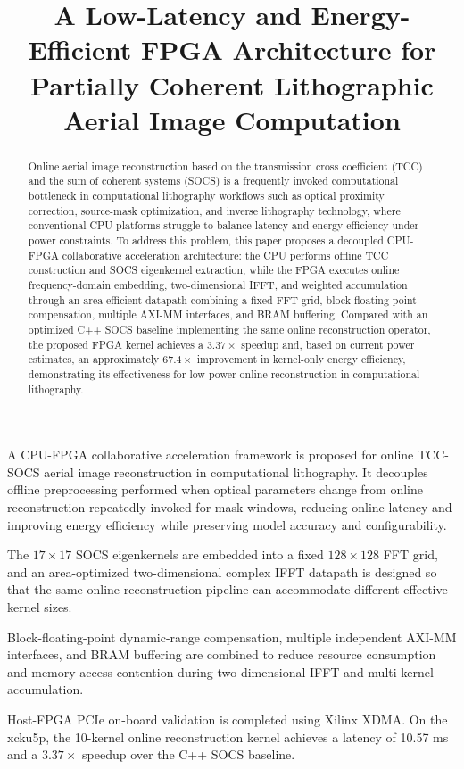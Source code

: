 \documentclass[
  preprint]{elsarticle}
\title{A Low-Latency and Energy-Efficient FPGA Architecture for Partially Coherent Lithographic Aerial Image Computation}
\author{}
\date{}
\begin{document}
\begin{frontmatter}
\maketitle

\begin{highlights}
\item
  A CPU-FPGA collaborative acceleration framework is proposed for online
  TCC-SOCS aerial image reconstruction in computational lithography. It
  decouples offline preprocessing performed when optical parameters
  change from online reconstruction repeatedly invoked for mask windows,
  reducing online latency and improving energy efficiency while
  preserving model accuracy and configurability.
\item
  The \(17 \times 17\) SOCS eigenkernels are embedded into a fixed
  \(128 \times 128\) FFT grid, and an area-optimized two-dimensional
  complex IFFT datapath is designed so that the same online
  reconstruction pipeline can accommodate different effective kernel
  sizes.
\item
  Block-floating-point dynamic-range compensation, multiple independent
  AXI-MM interfaces, and BRAM buffering are combined to reduce resource
  consumption and memory-access contention during two-dimensional IFFT
  and multi-kernel accumulation.
\item
  Host-FPGA PCIe on-board validation is completed using Xilinx XDMA. On
  the xcku5p, the 10-kernel online reconstruction kernel achieves a
  latency of 10.57 ms and a \(3.37\times\) speedup over the C++ SOCS
  baseline.
\end{highlights}

\begin{abstract}

Online aerial image reconstruction based on the transmission cross
coefficient (TCC) and the sum of coherent systems (SOCS) is a frequently
invoked computational bottleneck in computational lithography workflows
such as optical proximity correction, source-mask optimization, and
inverse lithography technology, where conventional CPU platforms
struggle to balance latency and energy efficiency under power
constraints. To address this problem, this paper proposes a decoupled
CPU-FPGA collaborative acceleration architecture: the CPU performs
offline TCC construction and SOCS eigenkernel extraction, while the FPGA
executes online frequency-domain embedding, two-dimensional IFFT, and
weighted accumulation through an area-efficient datapath combining a
fixed FFT grid, block-floating-point compensation, multiple AXI-MM
interfaces, and BRAM buffering. Compared with an optimized C++ SOCS
baseline implementing the same online reconstruction operator, the
proposed FPGA kernel achieves a \(3.37\times\) speedup and, based on
current power estimates, an approximately \(67.4\times\) improvement in
kernel-only energy efficiency, demonstrating its effectiveness for
low-power online reconstruction in computational lithography.


\end{abstract}
\end{frontmatter}
\end{document}
